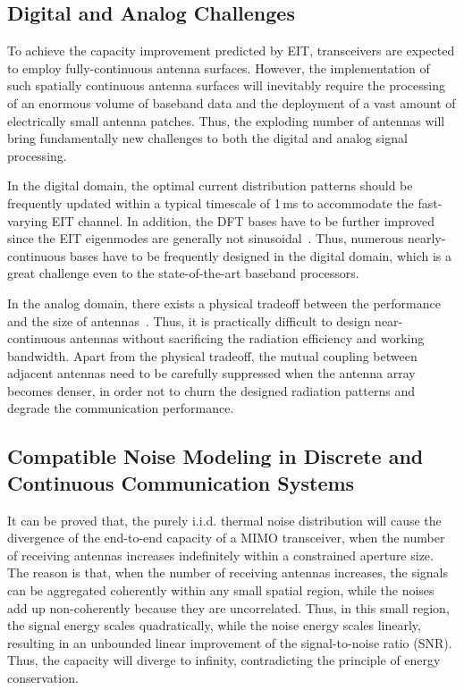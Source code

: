 \documentclass[journal,twocolumn]{IEEEtran}
\begin{document}
\subsection{Digital and Analog Challenges}
To achieve the capacity improvement predicted by EIT, transceivers are expected to employ fully-continuous antenna surfaces. However, the implementation of such spatially continuous antenna surfaces will inevitably require the processing of an enormous volume of baseband data and the deployment of a vast amount of electrically small antenna patches. Thus, the exploding number of antennas will bring fundamentally new challenges to both the digital and analog signal processing. 

In the digital domain, the optimal current distribution patterns should be frequently updated within a typical timescale of 1\,ms to accommodate the fast-varying EIT channel. In addition, the DFT bases have to be further improved since the EIT eigenmodes are generally not sinusoidal~\cite{marzetta2022fourier}. Thus, numerous nearly-continuous bases have to be frequently designed in the digital domain, which is a great challenge even to the state-of-the-art baseband processors.  

In the analog domain, there exists a physical tradeoff between the performance and the size of antennas~\cite{stratton2007electromagnetic}. Thus, it is practically difficult to design near-continuous antennas without sacrificing the radiation efficiency and working bandwidth. Apart from the physical tradeoff, the mutual coupling between adjacent antennas need to be carefully suppressed when the antenna array becomes denser, in order not to churn the designed radiation patterns and degrade the communication performance. 


\subsection{Compatible Noise Modeling in Discrete and Continuous Communication Systems}
It can be proved that, the purely i.i.d. thermal noise distribution will cause the divergence of the end-to-end capacity of a MIMO transceiver, when the number of receiving antennas increases indefinitely within a constrained aperture size. 
The reason is that, when the number of receiving antennas increases, the signals can be aggregated coherently within any small spatial region, while the noises add up non-coherently because they are uncorrelated. 
Thus, in this small region, the signal energy scales quadratically, while the noise energy scales linearly, resulting in an unbounded linear improvement of the signal-to-noise ratio (SNR). Thus, the capacity will diverge to infinity, contradicting the principle of energy conservation.  
\end{document}

